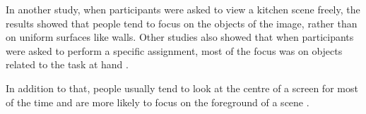 In another study, when participants were asked to view a kitchen scene freely, the results showed that people tend to focus on the objects of the image, rather than on uniform surfaces like walls. Other studies also showed that when participants were asked to perform a specific assignment, most of the focus was on objects related to the task at hand \cite{sundstedt2012gazing}. 


In addition to that, people usually tend to look at the centre of a screen for most of the time and are more likely to focus on the foreground of a scene \cite{osberger1998automatic}.